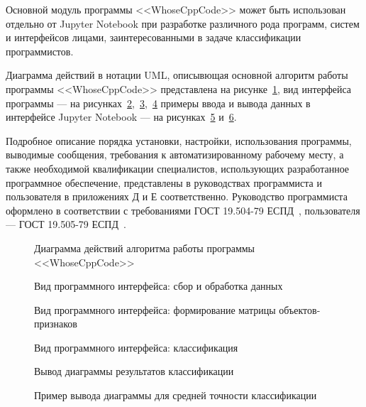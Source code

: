 Основной модуль программы <<WhoseCppCode>> может быть использован отдельно от Jupyter Notebook 
при разработке различного рода программ, систем и интерфейсов лицами, заинтересованными в задаче
классификации программистов.

Диаграмма действий в нотации UML, описывющая основной алгоритм работы программы <<WhoseCppCode>>
представлена на рисунке~\ref{flowchart:flowchart}, вид интерфейса программы --- 
на рисунках~\ref{user_notebook_1:user_notebook_1},~\ref{user_notebook_2:user_notebook_2},~\ref{user_notebook_3:user_notebook_3}
примеры ввода и вывода данных в интерфейсе Jupyter 
Notebook --- на рисунках~\ref{newplot:newplot} и~\ref{newplot2:newplot2}.

Подробное описание порядка установки, настройки, использования программы,
выводимые сообщения, требования к автоматизированному рабочему месту, а также
необходимой квалификации специалистов, использующих разработанное программное обеспечение,
представлены в руководствах программиста и пользователя в приложениях Д и Е соответственно.
Руководство программиста оформлено в соответствии с требованиями ГОСТ 19.504-79 ЕСПД~\cite{gost_19.504},
пользователя --- ГОСТ 19.505-79 ЕСПД~\cite{gost_19.505}.
% 
\begin{figure}[h!]
\caption{ Диаграмма действий алгоритма работы программы <<WhoseCppCode>> }
\label{flowchart:flowchart}
\end{figure}


\begin{figure}[h!]
\caption{ Вид программного интерфейса: сбор и обработка данных }
\label{user_notebook_1:user_notebook_1}
\end{figure}


\begin{figure}[h!]
\caption{ Вид программного интерфейса: формирование матрицы объектов-признаков }
\label{user_notebook_2:user_notebook_2}
\end{figure}

\begin{figure}[h!]
\caption{ Вид программного интерфейса: классификация }
\label{user_notebook_3:user_notebook_3}
\end{figure}


\begin{figure}[h!]
\caption{ Вывод диаграммы результатов классификации }
\label{newplot:newplot}
\end{figure}

\begin{figure}[t!]
\caption{ Пример вывода диаграммы для средней точности классификации }
\label{newplot2:newplot2}
\end{figure}




